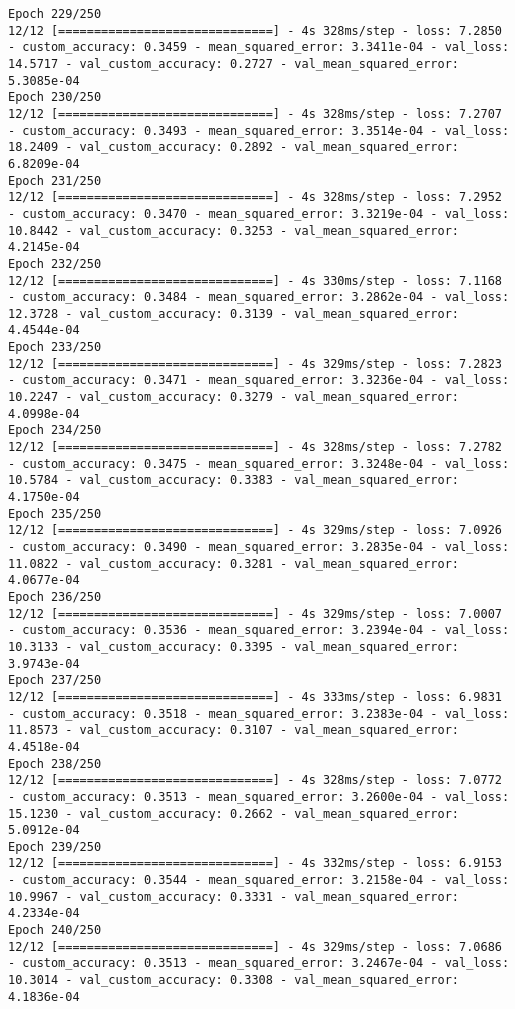 \begin{lstlisting}
Epoch 229/250
12/12 [==============================] - 4s 328ms/step - loss: 7.2850 - custom_accuracy: 0.3459 - mean_squared_error: 3.3411e-04 - val_loss: 14.5717 - val_custom_accuracy: 0.2727 - val_mean_squared_error: 5.3085e-04
Epoch 230/250
12/12 [==============================] - 4s 328ms/step - loss: 7.2707 - custom_accuracy: 0.3493 - mean_squared_error: 3.3514e-04 - val_loss: 18.2409 - val_custom_accuracy: 0.2892 - val_mean_squared_error: 6.8209e-04
Epoch 231/250
12/12 [==============================] - 4s 328ms/step - loss: 7.2952 - custom_accuracy: 0.3470 - mean_squared_error: 3.3219e-04 - val_loss: 10.8442 - val_custom_accuracy: 0.3253 - val_mean_squared_error: 4.2145e-04
Epoch 232/250
12/12 [==============================] - 4s 330ms/step - loss: 7.1168 - custom_accuracy: 0.3484 - mean_squared_error: 3.2862e-04 - val_loss: 12.3728 - val_custom_accuracy: 0.3139 - val_mean_squared_error: 4.4544e-04
Epoch 233/250
12/12 [==============================] - 4s 329ms/step - loss: 7.2823 - custom_accuracy: 0.3471 - mean_squared_error: 3.3236e-04 - val_loss: 10.2247 - val_custom_accuracy: 0.3279 - val_mean_squared_error: 4.0998e-04
Epoch 234/250
12/12 [==============================] - 4s 328ms/step - loss: 7.2782 - custom_accuracy: 0.3475 - mean_squared_error: 3.3248e-04 - val_loss: 10.5784 - val_custom_accuracy: 0.3383 - val_mean_squared_error: 4.1750e-04
Epoch 235/250
12/12 [==============================] - 4s 329ms/step - loss: 7.0926 - custom_accuracy: 0.3490 - mean_squared_error: 3.2835e-04 - val_loss: 11.0822 - val_custom_accuracy: 0.3281 - val_mean_squared_error: 4.0677e-04
Epoch 236/250
12/12 [==============================] - 4s 329ms/step - loss: 7.0007 - custom_accuracy: 0.3536 - mean_squared_error: 3.2394e-04 - val_loss: 10.3133 - val_custom_accuracy: 0.3395 - val_mean_squared_error: 3.9743e-04
Epoch 237/250
12/12 [==============================] - 4s 333ms/step - loss: 6.9831 - custom_accuracy: 0.3518 - mean_squared_error: 3.2383e-04 - val_loss: 11.8573 - val_custom_accuracy: 0.3107 - val_mean_squared_error: 4.4518e-04
Epoch 238/250
12/12 [==============================] - 4s 328ms/step - loss: 7.0772 - custom_accuracy: 0.3513 - mean_squared_error: 3.2600e-04 - val_loss: 15.1230 - val_custom_accuracy: 0.2662 - val_mean_squared_error: 5.0912e-04
Epoch 239/250
12/12 [==============================] - 4s 332ms/step - loss: 6.9153 - custom_accuracy: 0.3544 - mean_squared_error: 3.2158e-04 - val_loss: 10.9967 - val_custom_accuracy: 0.3331 - val_mean_squared_error: 4.2334e-04
Epoch 240/250
12/12 [==============================] - 4s 329ms/step - loss: 7.0686 - custom_accuracy: 0.3513 - mean_squared_error: 3.2467e-04 - val_loss: 10.3014 - val_custom_accuracy: 0.3308 - val_mean_squared_error: 4.1836e-04

\end{lstlisting}
